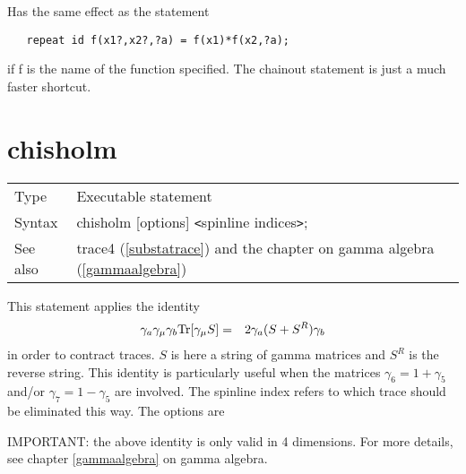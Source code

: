 \noindent Has the same effect as the statement
\begin{verbatim}
   repeat id f(x1?,x2?,?a) = f(x1)*f(x2,?a);
\end{verbatim}
if f is the name of the function specified. The chainout statement is just a 
much faster shortcut. \vspace{10mm}


\section{chisholm}
\label{substachisholm}

\noindent \begin{tabular}{ll}
Type & Executable statement\\
Syntax & chisholm [options] {\tt<}spinline indices{\tt>}; \\
See also & trace4 (\ref{substatrace}) and the chapter on gamma algebra 
(\ref{gammaalgebra})
\end{tabular} \vspace{4mm}

\noindent This statement applies the identity
\begin{eqnarray}
    \gamma_a\gamma_\mu\gamma_b {\rm Tr}[\gamma_\mu S] & = &
         2\gamma_a( S + S^R ) \gamma_b  \nonumber
\end{eqnarray}
\setcounter{equation}{2}
in order to contract traces. $S$ is here a string of
gamma matrices and $S^R$ is the reverse string. This 
identity is particularly useful when the matrices $\gamma_6 = 1+\gamma_5$ 
and/or $\gamma_7 = 1-\gamma_5$ are involved. The spinline index refers to 
which trace should be eliminated this way. The options are \vspace{1mm}
 


\noindent IMPORTANT: the above identity is only valid in 4 dimensions. For 
more details, see chapter \ref{gammaalgebra} on gamma algebra. \vspace{10mm}

